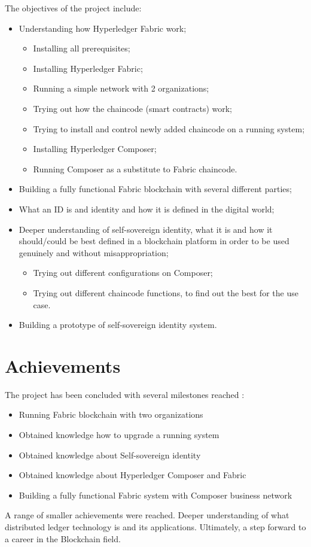 \documentclass[a4paper,11pt]{report}
\begin{document}
The objectives of the project include:  
\begin{itemize}
\item Understanding how Hyperledger Fabric work;
	\begin{itemize}
	\item Installing all prerequisites;
	\item Installing Hyperledger Fabric; 
	\item Running a simple network with 2 organizations; 
	\item Trying out how the chaincode (smart contracts) work;
	\item Trying to install and control newly added chaincode on a running system;
	\item Installing Hyperledger Composer;
	\item Running Composer as a substitute to Fabric chaincode. 
	\end{itemize}
\item Building a fully functional Fabric blockchain with several different parties;
\item What an ID is and identity and how it is defined in the digital world;
\item Deeper understanding of self-sovereign identity, what it is and how it should/could be best defined in a blockchain platform in order to be used genuinely and without misappropriation;
	\begin{itemize}
	\item Trying out different configurations on Composer;
	\item Trying out different chaincode functions, to find out the best for the use case.
	\end{itemize}
\item Building a prototype of self-sovereign identity system.

\end{itemize}



\section{Achievements}
\label{introduction-achievements}

The project has been concluded with several milestones reached :  
\begin{itemize}

\item Running Fabric blockchain with two organizations 

\item Obtained knowledge how to upgrade a running system 

\item Obtained knowledge about Self-sovereign identity  

\item Obtained knowledge about Hyperledger Composer and Fabric  

\item Building a fully functional Fabric system with Composer business network 
\end{itemize}
A range of smaller achievements were reached. Deeper understanding of what distributed ledger technology is and its applications. Ultimately, a step forward to a career in the Blockchain field. 
\end{document}
